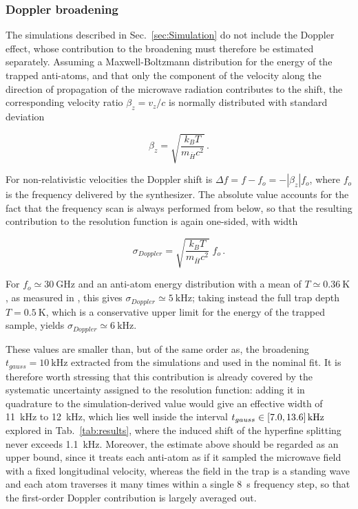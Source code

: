 \subsubsection{Doppler broadening} \label{sec:Doppler}

The simulations described in Sec.~\ref{sec:Simulation} do not include the Doppler effect, whose contribution to the broadening must therefore be estimated separately. Assuming a Maxwell-Boltzmann distribution for the energy of the trapped anti-atoms, and that only the component of the velocity along the direction of propagation of the microwave radiation contributes to the shift, the corresponding velocity ratio $\beta_z = v_z / c$ is normally distributed with standard deviation

\begin{equation}
\beta_z = \sqrt{\frac{k_B T}{m_{\overline{H}} c^{2}}} \, .
\end{equation}

For non-relativistic velocities the Doppler shift is $\Delta f = f - f_o = - |\beta_z| f_o$, where $f_o$ is the frequency delivered by the synthesizer. The absolute value accounts for the fact that the frequency scan is always performed from below, so that the resulting contribution to the resolution function is again one-sided, with width

\begin{equation}
\sigma_{Doppler} = \sqrt{\frac{k_B T}{m_{\overline{H}} c^{2}}} \; f_o \, .
\end{equation}

For $f_o \simeq \SI{30}{\giga \hertz}$ and an anti-atom energy distribution with a mean of $T \simeq \SI{0.36}{\kelvin}$, as measured in \cite{ALPHA:2024adiab}, this gives $\sigma_{Doppler} \simeq \SI{5}{\kilo \hertz}$; taking instead the full trap depth $T = \SI{0.5}{\kelvin}$, which is a conservative upper limit for the energy of the trapped sample, yields $\sigma_{Doppler} \simeq \SI{6}{\kilo \hertz}$.

These values are smaller than, but of the same order as, the broadening $t_{gauss} = \SI{10}{\kilo \hertz}$ extracted from the simulations and used in the nominal fit. It is therefore worth stressing that this contribution is already covered by the systematic uncertainty assigned to the resolution function: adding it in quadrature to the simulation-derived value would give an effective width of \SI{11}{\kilo \hertz} to \SI{12}{\kilo \hertz}, which lies well inside the interval $t_{gauss} \in [7.0, 13.6]\,{\rm kHz}$ explored in Tab.~\ref{tab:results}, where the induced shift of the hyperfine splitting never exceeds \SI{1.1}{\kilo \hertz}. Moreover, the estimate above should be regarded as an upper bound, since it treats each anti-atom as if it sampled the microwave field with a fixed longitudinal velocity, whereas the field in the trap is a standing wave and each atom traverses it many times within a single \SI{8}{\second} frequency step, so that the first-order Doppler contribution is largely averaged out. 

